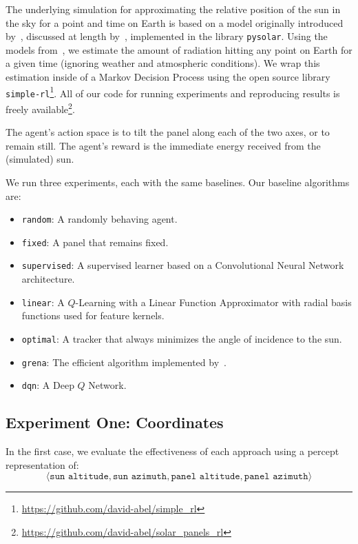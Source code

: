 \documentclass[11pt]{article}
\begin{document}
The underlying simulation for approximating the relative position of the sun in the sky for a point and time on Earth is based on a model originally introduced by~\citet{jordan1958chafer}, discussed at length by~\citet{masters2013renewable}, implemented in the library \texttt{pysolar}. Using the models from~\citet{masters2013renewable}, we estimate the amount of radiation hitting any point on Earth for a given time (ignoring weather and atmospheric conditions). We wrap this estimation inside of a Markov Decision Process using the open source library \texttt{simple-rl}\footnote{\url{https://github.com/david-abel/simple_rl}}. All of our code for running experiments and reproducing results is freely available\footnote{\url{https://github.com/david-abel/solar_panels_rl}}.

The agent's action space is to tilt the panel along each of the two axes, or to remain still. The agent's reward is the immediate energy received from the (simulated) sun.

We run three experiments, each with the same baselines. Our baseline algorithms are:
\begin{itemize}
\item \texttt{random}: A randomly behaving agent.
\item \texttt{fixed}: A panel that remains fixed.
\item \texttt{supervised}: A supervised learner based on a Convolutional Neural Network architecture.
\item \texttt{linear}: A $Q$-Learning with a Linear Function Approximator with radial basis functions used for feature kernels.
\item \texttt{optimal}: A tracker that always minimizes the angle of incidence to the sun.
\item \texttt{grena}: The efficient algorithm implemented by~\citet{Grena2008}.
\item \texttt{dqn}: A Deep $Q$ Network.
\end{itemize}

\subsection{Experiment One: Coordinates}

In the first case, we evaluate the effectiveness of each approach using a percept representation of:
\begin{equation}
\langle \texttt{sun altitude}, \texttt{sun azimuth}, \texttt{panel altitude}, \texttt{panel azimuth} \rangle
\end{equation}
\end{document}
